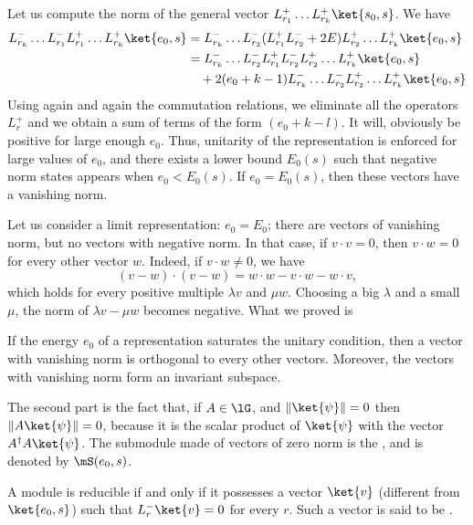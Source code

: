 Let us compute the norm of the general vector $L^+_{r_1}\ldots L^+_{r_k}\ket{s_0,s}$. We have
\begin{equation}
	\begin{aligned}[]
		L^-_{r_k}\ldots L^-_{r_1}L^+_{r_1}\ldots L^+_{r_k}\ket{e_0,s}
				&= L^-_{r_k}\ldots L^-_{r_2} (L^+_{r_1}L^-_{r_2}+2E) L^+_{r_2}\ldots L^+_{r_k}\ket{e_0,s}\\
				&= L^-_{r_k}\ldots L^-_{r_2}L^+_{r_1}L^-_{r_2}L^+_{r_2}\ldots L^+_{r_k}\ket{e_0,s}\\
				&\quad +2(e_0+k-1)L^-_{r_k}\ldots L^-_{r_2} L^+_{r_2}\ldots L^+_{r_k}\ket{e_0,s}
	\end{aligned}
\end{equation}
Using again and again the commutation relations, we eliminate all the operators $L^+_r$ and we obtain a sum of terms of the form $(e_0+k-l)$. It will, obviously be positive for large enough $e_0$. Thus, unitarity of the representation is enforced for large values of $e_0$, and there exists a lower bound $E_0(s)$ such that negative norm states appears when $e_0<E_0(s)$. If $e_0=E_0(s)$, then these vectors have a vanishing norm.

Let us consider a limit representation: $e_0=E_0$; there are vectors of vanishing norm, but no vectors with negative norm. In that case, if $v\cdot v=0$, then $v\cdot w=0$ for every other vector $w$. Indeed, if $v\cdot w\neq 0$, we have
\begin{equation}
	(v-w)\cdot(v-w)=w\cdot w - v\cdot w-w\cdot v,
\end{equation}
which holds for every positive multiple $\lambda v$ and $\mu w$. Choosing a big $\lambda$ and a small $\mu$, the norm of $\lambda v-\mu w$ becomes negative. What we proved is
\begin{lemma}
	If the energy $e_0$ of a representation saturates the unitary condition, then a vector with vanishing norm is orthogonal to every other vectors. Moreover, the vectors with vanishing norm form an invariant subspace.
\end{lemma}
The second part is the fact that, if $A\in\lG$, and $\| \ket{\psi} \|=0$  then $\| A\ket{\psi} \|=0$, because it is the scalar product of $\ket{\psi}$ with the vector $A^{\dag}A\ket{\psi}$. The submodule made of vectors of zero norm is the , and is denoted by $\mS(e_0,s)$.

\begin{proposition}		\label{PropSinModRedSSIADesNuls}
A module is reducible if and only if it possesses a vector $\ket{v}$ (different from $\ket{e_0,s}$) such that $L^-_r\ket{v}=0$ for every $r$. Such a vector is said to be .
\end{proposition}

